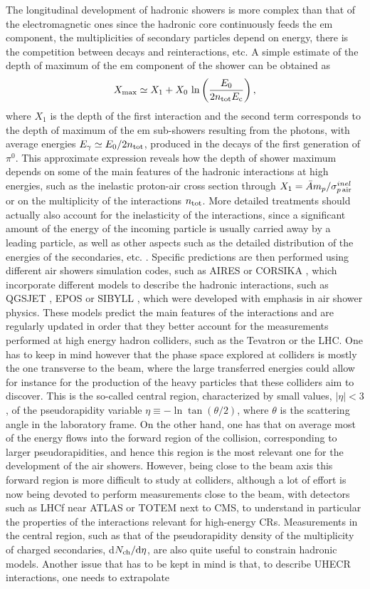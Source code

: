 \documentclass[twoside,12pt]{article}
\newcommand{\be}{\begin{equation}}
\newcommand{\ee}{\end{equation}}
\begin{document}
The longitudinal development of hadronic showers is more complex than that of the electromagnetic ones since the hadronic core continuously feeds the em component, the  multiplicities of secondary particles depend on energy, there is the competition between decays and reinteractions, etc. A simple estimate of the depth of maximum  of the em component of the  shower can be obtained as
\be 
X_{\rm max}\simeq X_1+X_0\,\ln \left(\frac{E_0}{2 n_{\rm tot}E_{\rm c}}\right),
\label{xmaxp}
\ee 
where $X_1$ is the depth of the first interaction and the second term corresponds to the depth of maximum of the em sub-showers resulting from the photons, with average energies $E_\gamma\simeq E_0/2n_{\rm tot}$, produced in the decays of the first generation of $\pi^0$. This approximate expression reveals how the depth of shower maximum depends on some of the main features of the hadronic interactions at high energies, such as the inelastic proton-air cross section through $X_1={\bar A}m_p/\sigma^{inel}_{p\,{\rm air}}$ or on the multiplicity of the interactions $n_{\rm tot}$. More detailed treatments should actually also account for the inelasticity of the interactions, since a significant amount of the energy of the incoming particle is usually carried away by a leading particle, as well as other aspects such as the detailed distribution of the energies of the secondaries, etc. \cite{ul11}. Specific predictions are then performed using different air showers simulation codes, such as AIRES \cite{aires} or CORSIKA \cite{corsika}, which incorporate different models to describe the hadronic interactions, such as QGSJET \cite{qgsjet}, EPOS \cite{epos} or  SIBYLL \cite{sibyll}, which were developed with emphasis in air shower physics. These models predict the main features of the interactions and are regularly updated \cite{de11,pi13} in order that they better account for the measurements performed at high energy hadron colliders, such as the Tevatron or the LHC. One has to keep in mind however that the phase space explored at colliders is mostly the one transverse to the beam, where the large transferred energies could allow for instance for the production of the heavy particles that these colliders aim to discover. This is the so-called central region, characterized by small values, $|\eta|<3$, of the pseudorapidity variable $\eta\equiv -\ln\tan(\theta/2)$, where $\theta$ is the scattering angle in the laboratory frame. On the other hand, one has that on average most of the energy flows into the forward region of the collision, corresponding to larger pseudorapidities, and hence this region is the most relevant one for the development of the air showers. However, being close to the beam axis  this forward region is more difficult to study at colliders, although a lot of effort is now being devoted to perform measurements close to the beam, with detectors such as LHCf near ATLAS or TOTEM next to CMS, to understand in particular the properties of the interactions relevant for high-energy CRs. Measurements in the central region, such as that of the pseudorapidity density of the multiplicity of charged secondaries, d$N_{\rm ch}/{\rm d}\eta$, are also quite useful to constrain hadronic models. Another issue that has to be kept in mind is that, to describe UHECR interactions, one needs to extrapolate 
\end{document}
